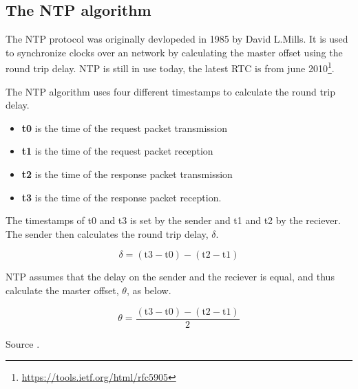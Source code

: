 \subsection{The NTP algorithm}
\label{sec:ntp}

The NTP protocol was originally devlopeded in 1985 by David L.Mills. It is used to synchronize clocks over an network by calculating the master offset using the round trip delay. NTP is still in use today, the latest RTC is from june 2010\footnote{\url{https://tools.ietf.org/html/rfc5905}}.

The NTP algorithm uses four different timestamps to calculate the round trip delay. 

\begin{itemize}
  \item[] \textbf{t0} is the time of the request packet transmission
  \item[] \textbf{t1} is the time of the request packet reception
  \item[] \textbf{t2} is the time of the response packet transmission
  \item[] \textbf{t3} is the time of the response packet reception.
\end{itemize}
\label{fig:ntpvars}

The timestamps of t0 and t3 is set by the sender and t1 and t2 by the reciever. The sender then calculates the round trip delay, $\delta$. 

\begin{displaymath}
	\delta = (\text{t3} - \text{t0}) - (\text{t2} - \text{t1})
\end{displaymath}
\label{fig:ntpdelta}

NTP assumes that the delay on the sender and the reciever is equal, and thus calculate the master offset, $\theta$,  as below. 

\begin{displaymath}
	\theta = \frac{(\text{t3} - \text{t0}) - (\text{t2} - \text{t1})}{2}
\end{displaymath}
\label{fig:ntpmo}

Source \cite{mills}.
